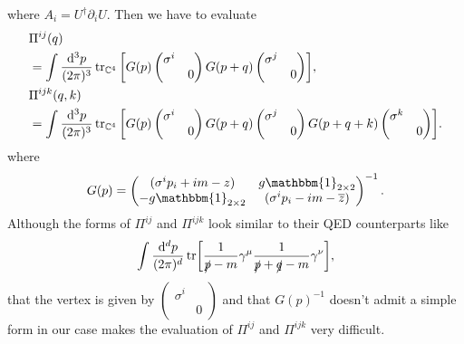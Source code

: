 \documentclass{article}
\begin{document}
where $A_i = U^\dagger \partial_i U$.
Then we have to evaluate
\begin{align*}
    &\Pi^{ij}(q)\\ &= \int \frac{\dd[3]{p}}{(2\pi)^3} \tr_{\mathbb{C}^4}\qty[G(p) \begin{pmatrix}
        \sigma^i & \\ & 0
    \end{pmatrix} G(p+q) \begin{pmatrix}
        \sigma^j & \\ & 0
    \end{pmatrix}], \\
    &\Pi^{ijk}(q,k)\\ &= \int \frac{\dd[3]{p}}{(2\pi)^3} \tr_{\mathbb{C}^4}\qty[G(p) \begin{pmatrix}
        \sigma^i & \\ & 0
    \end{pmatrix} G(p+q) \begin{pmatrix}
        \sigma^j & \\ & 0
    \end{pmatrix} G(p+q+k) \begin{pmatrix}
        \sigma^k & \\ & 0
    \end{pmatrix}].
\end{align*}
where
\[ G(p) = \begin{pmatrix}
    (\sigma^i p_i + im - z) & g\mathbbm{1}_{2\times 2} \\
    -g\mathbbm{1}_{2\times 2} & (\sigma^i p_i - im - \overline{z})
\end{pmatrix}^{-1}. \]
Although the forms of $\Pi^{ij}$ and $\Pi^{ijk}$ look similar to their QED counterparts like
\[ \int \frac{\dd[d]{p}}{(2\pi)^d} \tr[\frac{1}{\slashed{p} - m}\gamma^\mu \frac{1}{\slashed{p}+\slashed{q}-m}\gamma^\nu], \]
that the vertex is given by $\begin{pmatrix}
    \sigma^i & \\ & 0
\end{pmatrix}$ and that $G(p)^{-1}$ doesn't admit a simple form in our case makes the evaluation of $\Pi^{ij}$ and $\Pi^{ijk}$ very difficult.

% 
% 
\end{document}
